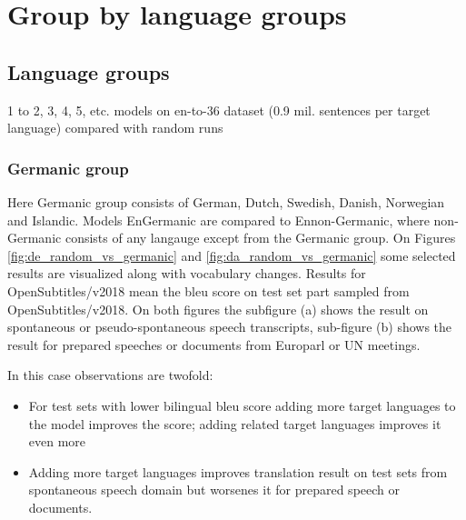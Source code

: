 \chapter{Group by language groups}


\section{Language groups}
1 to 2, 3, 4, 5, etc. models on en-to-36 dataset (0.9 mil. sentences per target language)
compared with random runs
\subsection{Germanic group}
\label{subsection:germanic_group}

Here Germanic group consists of German, Dutch, Swedish, Danish, Norwegian and Islandic.
Models En\to{}Germanic are compared to En\to{}non-Germanic, where non-Germanic consists
of any langauge except from the Germanic group.
On Figures \ref{fig:de_random_vs_germanic} and \ref{fig:da_random_vs_germanic} some selected
results are visualized along with vocabulary changes. Results for OpenSubtitles/v2018 mean
the \acrshort{bleu} score on test set part sampled from OpenSubtitles/v2018.
On both figures the subfigure (a) shows the result on spontaneous or pseudo-spontaneous speech
transcripts, sub-figure (b) shows the result for prepared speeches or documents from Europarl
or UN meetings.

In this case observations are twofold:
\begin{itemize}
	\item For test sets with lower bilingual \acrshort{bleu} score adding more target languages
		to the model improves the score;
		adding related target languages improves it even more
	\item Adding more target languages improves translation result on test
		sets from spontaneous speech domain
		but worsenes it for prepared speech or documents.
\end{itemize}

